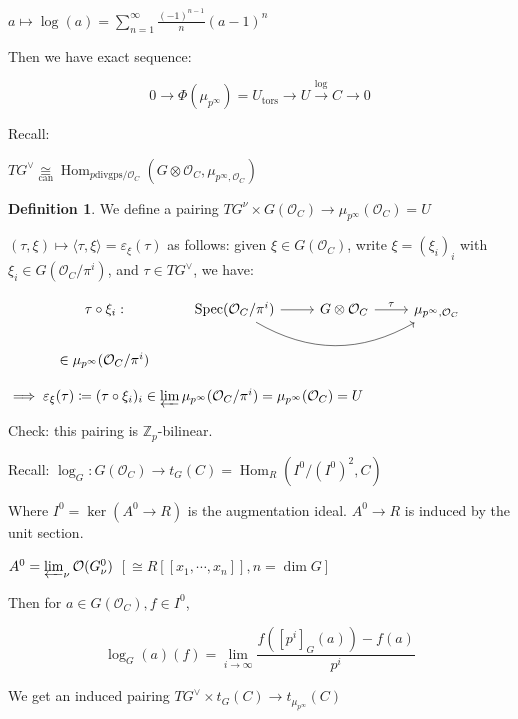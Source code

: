 \documentclass{article}
\theoremstyle{definition}
\newtheorem*{definition}{Definition}
\numberwithin{theorem}{subsection}
\begin{document}
    \(a \mapsto \log(a) = \sum_{n=1}^{\infty} \frac{(-1)^{n-1}}{n} (a-1)^n\)
    
    Then we have exact sequence:

    \[
        0 \to \Phi(\mu_{p^{\infty}}) = U_{\text{tors}} \to U \xrightarrow{\log} C \to 0
    \]

    Recall:

    \(T G^\vee \underset{\text{can}}{\cong} \operatorname{Hom}_{p \text{divgps} / \mathcal{O}_C}(G \otimes \mathcal{O}_C , \mu_{p^{\infty}, \mathcal{O}_C})\) 

    \begin{definition}
        We define a pairing \(T G^{\nu} \times G(\mathcal{O}_C) \to \mu_{p^{\infty}}(\mathcal{O}_C) = U\)
        
        \((\tau, \xi) \mapsto \langle \tau, \xi \rangle = \varepsilon_\xi (\tau)\) as follows: given \(\xi \in G(\mathcal{O}_C)\), write \(\xi = (\xi_i)_i\) with \(\xi_i \in G(\mathcal{O}_C / \pi^i)\), and \(\tau \in TG^\vee\), we have:
        
        \[
            \begin{tikzcd}
                \tau \circ \xi_i : & \operatorname{Spec}(\mathcal{O}_C / \pi^i) \ar[r] \ar[rr, bend right] & G \otimes \mathcal{O}_C \ar[r,"\tau"] & \mu_{p^{\infty}, \mathcal{O}_C} \\ \in \mu_{p^{\infty}}(\mathcal{O}_C / \pi^i)
            \end{tikzcd}
        \]

        \(\implies \varepsilon_\xi(\tau) \coloneqq (\tau \circ \xi_i)_i \in \varprojlim \mu_{p^{\infty}}(\mathcal{O}_C / \pi^i) = \mu_{p^{\infty}}(\mathcal{O}_C) = U\)
        
        Check: this pairing is \(\mathbb{Z}_p\)-bilinear.
    \end{definition}

    Recall: \(\log_G : G(\mathcal{O}_C) \to t_G(C) = \operatorname{Hom}_R(I^0 / (I^0)^2, C)\)

    Where \(I^0 = \ker (A^0 \to R)\) is the augmentation ideal. \(A^0 \to R\) is induced by the unit section.

    \(A^0 = \varprojlim_\nu \mathcal{O}(G^0_\nu)\) \([\cong R[[x_1, \cdots , x_n]], n = \dim G]\)

    Then for \(a\in G(\mathcal{O}_C), f\in I^0\),

    \[
        \log_G(a)(f) = \lim_{i \to \infty} \frac{f([p^i]_G (a)) - f(a)}{p^i}
    \]

    We get an induced pairing \(TG^\vee \times t_G(C) \to t_{\mu_{p^{\infty}}}(C)\) 
\end{document}
